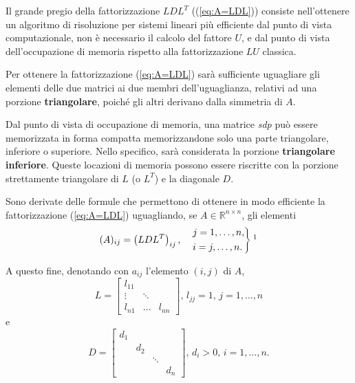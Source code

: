 Il grande pregio della fattorizzazione $LDL^T$ ((\ref{eq:A=LDL})) consiste nell'ottenere un algoritmo di risoluzione per sistemi lineari più efficiente dal punto di vista computazionale, non è necessario il calcolo del fattore $U$, e dal punto di vista dell'occupazione di memoria rispetto alla fattorizzazione $LU$ classica.

Per ottenere la fattorizzazione (\ref{eq:A=LDL}) sarà sufficiente uguagliare gli elementi delle due matrici ai due membri dell'uguaglianza, relativi ad una porzione \textbf{triangolare}, poiché gli altri derivano dalla simmetria di $A$.

Dal punto di vista di occupazione di memoria, una matrice \textit{sdp} può essere memorizzata in forma compatta memorizzandone solo una parte triangolare, inferiore o superiore. Nello specifico, sarà considerata la porzione \textbf{triangolare inferiore}. Queste locazioni di memoria possono essere riscritte con la porzione strettamente triangolare di $L$ (o $L^T$) e la diagonale $D$.

Sono derivate delle formule che permettono di ottenere in modo efficiente la fattorizzazione (\ref{eq:A=LDL}) uguagliando, se $A\in \mathbb R^{n\times n}$, gli elementi
\begin{equation*}
    (A)_{ij}=\left(LDL^T\right)_{ij},\quad\begin{rcases}
         j=1,\hdots,n,\\
         i=j,\hdots, n.
    \end{rcases}\footnotemark
\end{equation*}

A questo fine, denotando con $a_{ij}$ l'elemento $(i,j)$ di $A$,
\begin{equation*}
    L = 
    \begin{bmatrix}
        l_{11}\\
        \vdots & \ddots\\
        l_{n1} &\hdots & l_{nn}
    \end{bmatrix},\, 
    l_{jj}=1,\,j=1,\hdots, n
\end{equation*}
e
\begin{equation*}
    D=
    \begin{bmatrix}
        d_1\\
        & d_2\\
        & & \ddots\\
        & & & d_n
    \end{bmatrix},\,
        d_i>0,\,i=1,\hdots, n.
\end{equation*}


